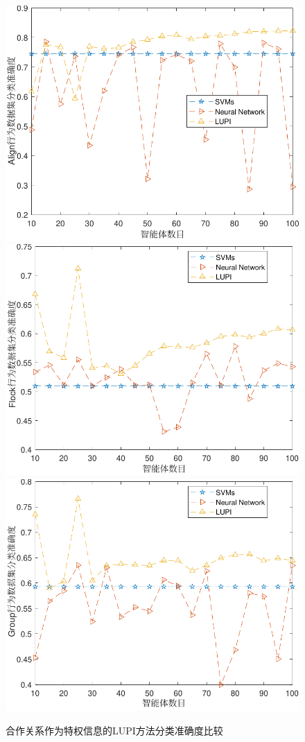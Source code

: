\begin{figure}
\centering
\includegraphics[width=.7\textwidth]{Img/chapter10/align-agent-PI1.pdf}
\includegraphics[width=.7\textwidth]{Img/chapter10/flock-agent-PI1.pdf}
\includegraphics[width=.7\textwidth]{Img/chapter10/group-agent-PI1.pdf}
\caption{合作关系作为特权信息的LUPI方法分类准确度比较}
\label{fig:agents-accuracy}
\end{figure}

